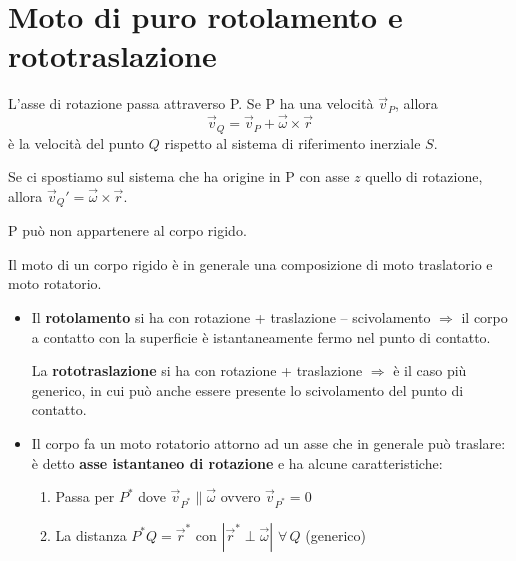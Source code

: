 
\section{Moto di puro rotolamento e rototraslazione}

L'asse di rotazione passa attraverso P. Se P ha una velocità $\vec{v}_P$, allora
\begin{equation}
\vec{v}_Q = \vec{v}_P + \vec{\omega} \times \vec{r}
\end{equation}
è la velocità del punto $Q$ rispetto al sistema di riferimento inerziale $S$.

Se ci spostiamo sul sistema che ha origine in P con asse $z$ quello di rotazione, allora $\vec{v}_Q' = \vec{\omega} \times \vec{r}$.


P può non appartenere al corpo rigido.

\begin{osservazione}{}
Il moto di un corpo rigido è in generale una composizione di moto traslatorio e moto rotatorio.
\end{osservazione}

\begin{itemize}
    \item Il \textbf{rotolamento} si ha con rotazione + traslazione -- scivolamento $\Rightarrow$ il corpo a contatto con la superficie è istantaneamente fermo nel punto di contatto.
    
    La \textbf{rototraslazione} si ha con rotazione + traslazione $\Rightarrow$ è il caso più generico, in cui può anche essere presente lo scivolamento del punto di contatto.

    \item Il corpo fa un moto rotatorio attorno ad un asse che in generale può traslare: è detto \textbf{asse istantaneo di rotazione} e ha alcune caratteristiche:
    \begin{enumerate}
        \item Passa per $P^*$ dove $\vec{v}_{P^*} \parallel \vec{\omega}$ ovvero $\vec{v}_{P^*} = 0$
        \item La distanza $P^*Q = \vec{r}^*$ con $|\vec{r}^* \perp \vec{\omega}|$ $\forall\, Q$ (generico)
    \end{enumerate}
\end{itemize}

